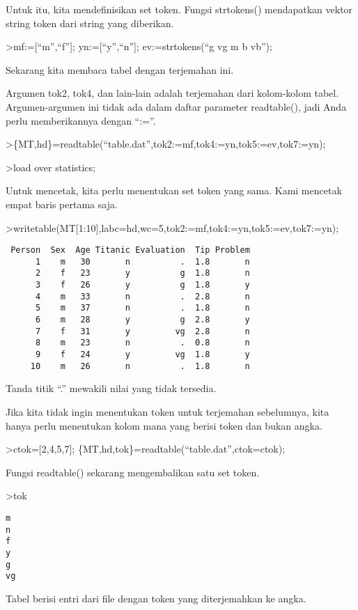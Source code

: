 \documentclass[
]{book}
\begin{document}
Untuk itu, kita mendefinisikan set token. Fungsi strtokens() mendapatkan vektor string token dari string yang diberikan.

\textgreater mf:={[}``m'',``f''{]}; yn:={[}``y'',``n''{]}; ev:=strtokens(``g vg m b vb'');

Sekarang kita membaca tabel dengan terjemahan ini.

Argumen tok2, tok4, dan lain-lain adalah terjemahan dari kolom-kolom tabel. Argumen-argumen ini tidak ada dalam daftar parameter readtable(), jadi Anda perlu memberikannya dengan ``:=''.

\textgreater\{MT,hd\}=readtable(``table.dat'',tok2:=mf,tok4:=yn,tok5:=ev,tok7:=yn);

\textgreater load over statistics;

Untuk mencetak, kita perlu menentukan set token yang sama. Kami mencetak empat baris pertama saja.

\textgreater writetable(MT{[}1:10{]},labc=hd,wc=5,tok2:=mf,tok4:=yn,tok5:=ev,tok7:=yn);

\begin{verbatim}
 Person  Sex  Age Titanic Evaluation  Tip Problem
      1    m   30       n          .  1.8       n
      2    f   23       y          g  1.8       n
      3    f   26       y          g  1.8       y
      4    m   33       n          .  2.8       n
      5    m   37       n          .  1.8       n
      6    m   28       y          g  2.8       y
      7    f   31       y         vg  2.8       n
      8    m   23       n          .  0.8       n
      9    f   24       y         vg  1.8       y
     10    m   26       n          .  1.8       n
\end{verbatim}

Tanda titik ``.'' mewakili nilai yang tidak tersedia.

Jika kita tidak ingin menentukan token untuk terjemahan sebelumnya, kita hanya perlu menentukan kolom mana yang berisi token dan bukan angka.

\textgreater ctok={[}2,4,5,7{]}; \{MT,hd,tok\}=readtable(``table.dat'',ctok=ctok);

Fungsi readtable() sekarang mengembalikan satu set token.

\textgreater tok

\begin{verbatim}
m
n
f
y
g
vg
\end{verbatim}

Tabel berisi entri dari file dengan token yang diterjemahkan ke angka.
\end{document}
